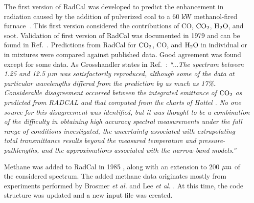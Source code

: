 The first version of RadCal was developed to predict the enhancement in radiation caused by the addition of pulverized coal to a 60 kW methanol-fired furnace~\cite{Grosshandler1976}. This first version considered the contributions of CO, $\rm CO_2$, $\rm H_2O$, and soot. Validation of first version of RadCal was documented in 1979 and can be found in Ref.~\cite{Grosshandler1979}. Predictions from RadCal for $\rm CO_2$, CO, and $\rm H_2O$ in individual or in mixtures were compared against published data. Good agreement was found except for some data. As Grosshandler states in Ref.~\cite{Grosshandler1993}:
\textit{``...The spectrum between 1.25 and 12.5 $\mu$m was satisfactorily reproduced, although some of the data at particular wavelengths differed from the prediction by as much as 17\%. Considerable disagreement occurred between the integrated emittance of $\rm CO_2$ as predicted from RADCAL and that computed from the charts of Hottel \cite{Hottel1954}. No one source for this disagreement was identified, but it was thought to be a combination of the difficulty in obtaining high accuracy spectral measurements under the full range of conditions investigated, the uncertainty associated with extrapolating total transmittance results beyond the measured temperature and pressure-pathlengths, and the approximations associated with the narrow-band models.''}

Methane was added to RadCal in 1985 \cite{Grosshandler1985}, along with an extension to 200 $\rm \mu m$ of the considered spectrum. The added methane data originates mostly from experiments performed by Brosmer \textit{et al.} \cite{Brosmer1985} and Lee \textit{et al.} \cite{Lee1964}. At this time, the code structure was updated and a new input file was created.

